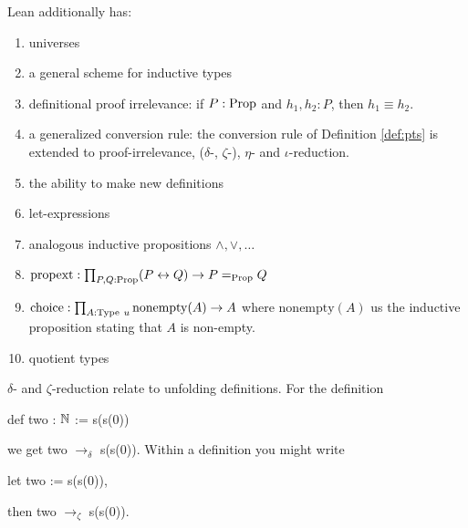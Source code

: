 \begin{rem}
    Lean additionally has: 
    \begin{enumerate}
        \item universes
        \item a general scheme for inductive types
        \item definitional proof irrelevance: if $P : \mathrm{Prop}$ and $h_1, h_2 : P$, then $h_1 \equiv h_2$.
        \item a generalized conversion rule: the conversion rule of Definition \ref{def:pts} is extended to proof-irrelevance, ($\delta$-, $\zeta$-), $\eta$- and $\iota$-reduction.
        \item the ability to make new definitions
        \item let-expressions
        \item analogous inductive propositions ${\wedge}, {\vee}, \dots$
        \item $\mathrm{propext}: \prod_{P, Q : \mathrm{Prop}} (P \leftrightarrow Q) \to P \mathrel{=_{\mathrm{Prop}}} Q$
        \item $\mathrm{choice} : \prod_{A : \mathrm{Type}\ u} \mathrm{nonempty}(A) \to A$ where $\mathrm{nonempty}(A)$ us the inductive proposition stating that $A$ is non-empty.
        \item quotient types
    \end{enumerate}
\end{rem}

\begin{example}
    $\delta$- and $\zeta$-reduction relate to unfolding definitions.
    For the definition 
    \begin{center}
        {\ttfamily def two : $\mathbb{N}$ := s(s(0))}
    \end{center} 
    we get {\ttfamily two $\mathrel{\to_\delta}$ s(s(0))}. 
    Within a definition you might write 
    \begin{center}
        {\ttfamily let two := s(s(0))}, 
    \end{center}
    then {\ttfamily two $\to_{\zeta}$ s(s(0))}.
\end{example}

